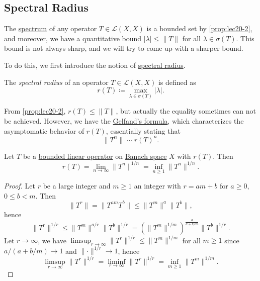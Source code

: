 \subsection{Spectral Radius}
The \hyperref[def:spectrum-point]{spectrum} of any operator \(T\in \mathcal{L} (X, X)\) is a bounded set by \autoref{prop:lec20-2}, and moreover, we have a quantitative bound \(\vert \lambda  \vert \leq \lVert T \rVert  \) for all \(\lambda \in \sigma (T)\). This bound is not always sharp, and we will try to come up with a sharper bound.

To do this, we first introduce the notion of \hyperref[def:spectral-radius]{spectral radius}.

\begin{definition}\label{def:spectral-radius}
	The \emph{spectral radius} of an operator \(T\in \mathcal{L} (X, X)\) is defined as
	\[
		r(T) \coloneqq \max _{\lambda\in \sigma (T) }\vert \lambda \vert .
	\]
\end{definition}

From \autoref{prop:lec20-2}, \(r(T) \leq \lVert T \rVert \), but actually the equality sometimes can not be achieved. However, we have the \hyperref[thm:Gelfand-formula]{Gelfand's formula}, which characterizes the asymptomatic behavior of \(r(T)\), essentially stating that
\[
	\lVert T^n \rVert \sim r(T)^n.
\]

\begin{theorem}\label{thm:Gelfand-formula}
	Let \(T\) be a \hyperref[def:bounded-linear-op]{bounded linear operator} on \hyperref[def:Banach-space]{Banach space} \(X\) with \(r(T)\). Then
	\[
		r(T) = \lim_{n \to \infty} \lVert T^n \rVert ^{1 / n} = \inf _{n\geq 1}\lVert T^n \rVert ^{1 / n}.
	\]
\end{theorem}
\begin{proof}\let\qed\relax
	Let \(r\) be a large integer and \(m\geq 1\) an integer with \(r = am+b\) for \(a \geq 0\), \(0 \leq b < m\). Then
	\[
		\lVert T^r \rVert
		= \lVert T^{am} T^b\rVert
		\leq \lVert T^m \rVert ^a \lVert T^b \rVert,
	\]
	hence
	\[
		\lVert T^r \rVert ^{1 / r}
		\leq \lVert T^m \rVert ^{a / r} \lVert T^b \rVert ^{1 / r}
		= \left( \lVert T^m \rVert ^{1 / m} \right) ^{\frac{a}{a+ b / m}} \lVert T^b \rVert ^{1 / r}.
	\]
	Let \(r \to \infty \), we have \(\limsup_{r \to \infty} \lVert T^r \rVert ^{1 / r} \leq \lVert T^m \rVert ^{1 / m}\) for all \(m \geq 1\) since \(a / (a + b / m) \to 1\) and \(\lVert \cdot \rVert ^{1 / r} \to 1\), hence
	\[
		\limsup_{r \to \infty} \lVert T^r \rVert ^{1 / r}
		= \liminf_{r \to \infty} \lVert T^r \rVert ^{1 / r}
		= \inf _{m\geq 1}\lVert T^m \rVert ^{1 / m}.
	\]
\end{proof}